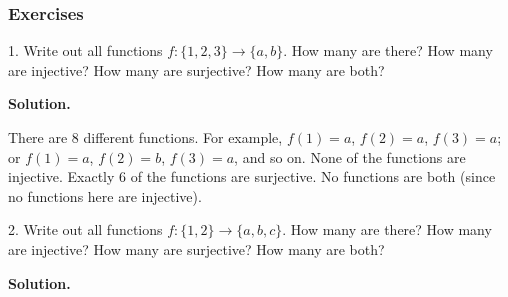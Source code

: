 \documentclass[10pt,]{book}
\theoremstyle{plain}
\theoremstyle{definition}
\theoremstyle{definition}
\theoremstyle{definition}
\numberwithin{equation}{section}
\begin{document}
\subsubsection[Exercises]{Exercises}\label{exercises-3}
\begin{exerciselist}
\item[1.]\hypertarget{exercise-27}{}
Write out all functions \(f: \{1,2,3\} \to \{a,b\}\). How many are there? How many are injective? How many are surjective? How many are both?
%
\par\smallskip
\par\smallskip
\noindent\textbf{Solution.}\hypertarget{solution-45}{}\quad

There are 8 different functions. For example, \(f(1) = a\), \(f(2) = a\), \(f(3) = a\); or \(f(1) = a\), \(f(2) = b\), \(f(3) = a\), and so on. None of the functions are injective. Exactly 6 of the functions are surjective. No functions are both (since no functions here are injective).
%
\item[2.]\hypertarget{exercise-28}{}
Write out all functions \(f: \{1,2\} \to \{a,b,c\}\). How many are there? How many are injective? How many are surjective? How many are both?
%
\par\smallskip
\par\smallskip
\noindent\textbf{Solution.}\hypertarget{solution-46}{}\quad


\end{exerciselist}
\end{document}
